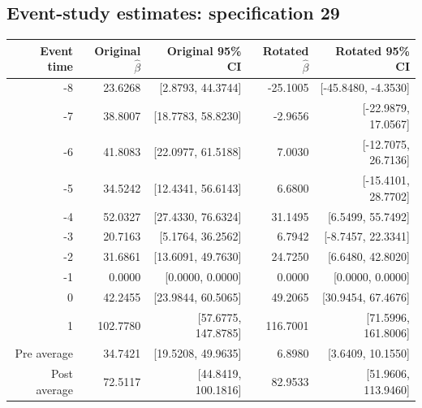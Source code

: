 \documentclass[10pt]{article}
\begin{document}
\subsection*{Event-study estimates: specification 29}
\begin{center}\scriptsize
\begin{tabular}{r rr rr}
\toprule
Event time & Original $\hat\beta$ & Original 95\% CI & Rotated $\hat\beta$ & Rotated 95\% CI \\
\midrule
-8 & 23.6268 & [2.8793, 44.3744] & -25.1005 & [-45.8480, -4.3530] \\
-7 & 38.8007 & [18.7783, 58.8230] & -2.9656 & [-22.9879, 17.0567] \\
-6 & 41.8083 & [22.0977, 61.5188] & 7.0030 & [-12.7075, 26.7136] \\
-5 & 34.5242 & [12.4341, 56.6143] & 6.6800 & [-15.4101, 28.7702] \\
-4 & 52.0327 & [27.4330, 76.6324] & 31.1495 & [6.5499, 55.7492] \\
-3 & 20.7163 & [5.1764, 36.2562] & 6.7942 & [-8.7457, 22.3341] \\
-2 & 31.6861 & [13.6091, 49.7630] & 24.7250 & [6.6480, 42.8020] \\
-1 & 0.0000 & [0.0000, 0.0000] & 0.0000 & [0.0000, 0.0000] \\
0 & 42.2455 & [23.9844, 60.5065] & 49.2065 & [30.9454, 67.4676] \\
1 & 102.7780 & [57.6775, 147.8785] & 116.7001 & [71.5996, 161.8006] \\
\midrule
Pre average & 34.7421 & [19.5208, 49.9635] & 6.8980 & [3.6409, 10.1550] \\
Post average & 72.5117 & [44.8419, 100.1816] & 82.9533 & [51.9606, 113.9460] \\
\bottomrule
\end{tabular}
\end{center}
\clearpage
\end{document}
